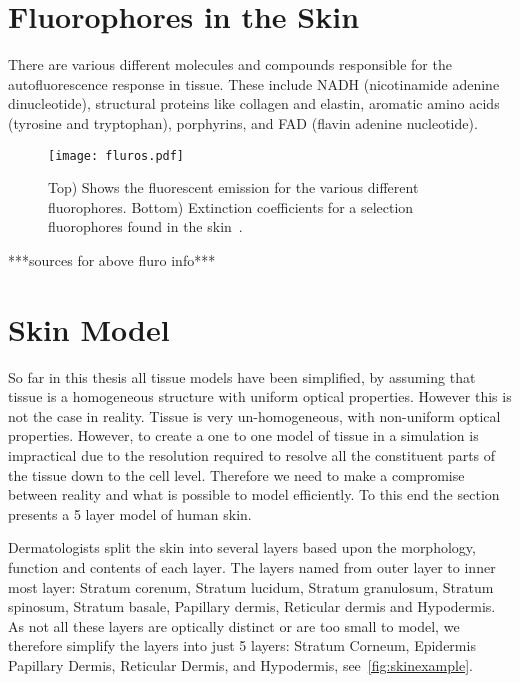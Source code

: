 \section*{Fluorophores in the Skin}

There are various different molecules and compounds responsible for the autofluorescence response in tissue.
These include NADH (nicotinamide adenine dinucleotide), structural proteins like collagen and elastin, aromatic amino acids (tyrosine and tryptophan), porphyrins, and FAD (flavin adenine nucleotide).


\begin{figure}[!htbp]
  \centering
  \texttt{[image: fluros.pdf]}
  \caption{Top) Shows the fluorescent emission for the various different fluorophores. Bottom) Extinction coefficients for a selection fluorophores found in the skin~\cite{prahltyro,prahltryto}.}
  \label{fig:flurosshow}
\end{figure}

***sources for above fluro info***


\section{Skin Model}

So far in this thesis all tissue models have been simplified, by assuming that tissue is a homogeneous structure with uniform optical properties.
However this is not the case in reality.
Tissue is very un-homogeneous, with non-uniform optical properties.
However, to create a one to one model of tissue in a simulation is impractical due to the resolution required to resolve all the constituent parts of the tissue down to the cell level.
Therefore we need to make a compromise between reality and what is possible to model efficiently.
To this end the section presents a 5 layer model of human skin. 

Dermatologists split the skin into several layers based upon the morphology, function and contents of each layer.
The layers named from outer layer to inner most layer: Stratum corenum, Stratum lucidum, Stratum granulosum, Stratum spinosum, Stratum basale, Papillary dermis, Reticular dermis and Hypodermis.
As not all these layers are optically distinct or are too small to model, we therefore simplify the layers into just 5 layers: Stratum Corneum, Epidermis Papillary Dermis, Reticular Dermis, and Hypodermis, see~\cref{fig:skinexample}.

